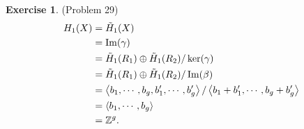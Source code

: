 \documentclass[psamsfonts]{amsart}
\theoremstyle{definition}
\newtheorem*{exer}{Exercise}
\theoremstyle{remark}
\numberwithin{equation}{section}
\begin{document}
\begin{exer}{(Problem 29)}
  \begin{align*}
    H_1(X)
      &= \tilde{H}_1(X) \\
      &= \Im(\gamma) \\
      &= \tilde{H}_1(R_1) \oplus \tilde{H}_1(R_2) / \ker(\gamma) \\
      &= \tilde{H}_1(R_1) \oplus \tilde{H}_1(R_2) / \Im(\beta) \\
      &= \ev{b_1, \cdots, b_g, b_1', \cdots, b_g'} / \ev{b_1 + b_1', \cdots, b_g + b_g'} \\
      &= \ev{b_1, \cdots, b_g} \\
      &= \mathbb{Z}^g.
  \end{align*}

\end{exer}
\end{document}
